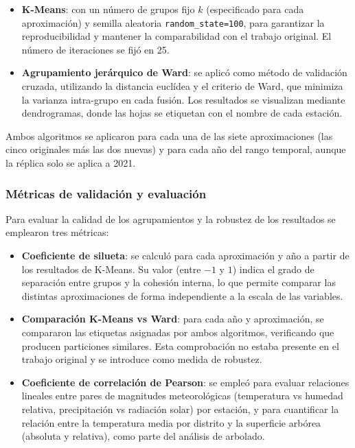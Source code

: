 \begin{itemize}
	\item \textbf{K-Means}: con un número de grupos fijo $k$ (especificado para cada aproximación) y semilla aleatoria \texttt{random\_state=100}, para garantizar la reproducibilidad y mantener la comparabilidad con el trabajo original. El número de iteraciones se fijó en 25.
	\item \textbf{Agrupamiento jerárquico de Ward}: se aplicó como método de validación cruzada, utilizando la distancia euclídea y el criterio de Ward, que minimiza la varianza intra-grupo en cada fusión. Los resultados se visualizan mediante dendrogramas, donde las hojas se etiquetan con el nombre de cada estación.
\end{itemize}

Ambos algoritmos se aplicaron para cada una de las siete aproximaciones (las cinco originales más las dos nuevas) y para cada año del rango temporal, aunque la réplica solo se aplica a 2021.

\subsubsection{Métricas de validación y evaluación}

Para evaluar la calidad de los agrupamientos y la robustez de los resultados se emplearon tres métricas:

\begin{itemize}
	\item \textbf{Coeficiente de silueta}: se calculó para cada aproximación y año a partir de los resultados de K-Means. Su valor (entre $-1$ y $1$) indica el grado de separación entre grupos y la cohesión interna, lo que permite comparar las distintas aproximaciones de forma independiente a la escala de las variables.
	\item \textbf{Comparación K-Means vs Ward}: para cada año y aproximación, se compararon las etiquetas asignadas por ambos algoritmos, verificando que producen particiones similares. Esta comprobación no estaba presente en el trabajo original y se introduce como medida de robustez.
	\item \textbf{Coeficiente de correlación de Pearson}: se empleó para evaluar relaciones lineales entre pares de magnitudes meteorológicas (temperatura vs humedad relativa, precipitación vs radiación solar) por estación, y para cuantificar la relación entre la temperatura media por distrito y la superficie arbórea (absoluta y relativa), como parte del análisis de arbolado.
\end{itemize}

